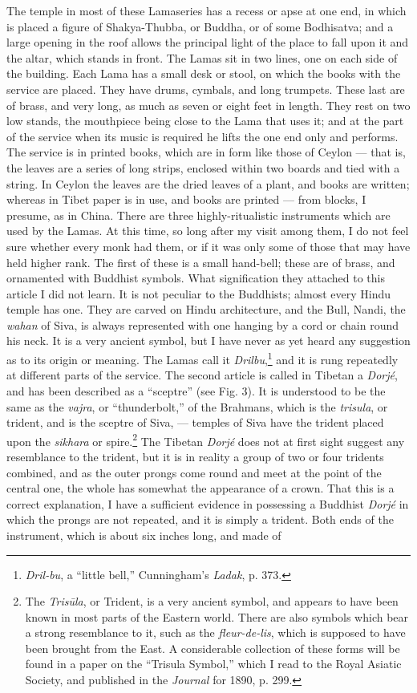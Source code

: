 \documentclass[a4paper, 11pt, oneside, polutonikogreek, english]{article}
\begin{document}
The temple in most of these Lamaseries has a recess or apse at one end, in which is placed a figure of Shakya-Thubba, or Buddha, or of some Bodhisatva; and a large opening in the roof allows the principal light of the place to fall upon it and the altar, which stands in front. The Lamas sit in two lines, one on each side of the building. Each Lama has a small desk or stool, on which the books with the service are placed. They have drums, cymbals, and long trumpets. These last are of brass, and very long, as much as seven or eight feet in length. They rest on two low stands, the mouthpiece being close to the Lama that uses it; and at the part of the service when its music is required he lifts the one end only and performs. The service is in printed books, which are in form like those of Ceylon --- that is, the leaves are a series of long strips, enclosed within two boards and tied with a string. In Ceylon the leaves are the dried leaves of a plant, and books are written; whereas in Tibet paper is in use, and books are printed --- from blocks, I presume, as in China. There are three highly-ritualistic instruments which are used by the Lamas. At this time, so long after my visit among them, I do not feel sure whether every monk had them, or if it was only some of those that may have held higher rank. The first of these is a small hand-bell; these are of brass, and ornamented with Buddhist symbols. What signification they attached to this article I did not learn. It is not peculiar to the Buddhists; almost every Hindu temple has one. They are carved on Hindu architecture, and the Bull, Nandi, the \emph{wahan} of Siva, is always represented with one hanging by a cord or chain round his neck. It is a very ancient symbol, but I have never as yet heard any suggestion as to its origin or meaning. The Lamas call it \emph{Drilbu},\footnote{\emph{Dril-bu}, a ``little bell,'' Cunningham's \emph{Ladak}, p. 373.} and it is rung repeatedly at different parts of the service. The second article is called in Tibetan a \emph{Dorjé}, and has been described as a ``sceptre'' (see Fig. 3). It is understood to be the same as the \emph{vajra}, or ``thunderbolt,'' of the Brahmans, which is the \emph{trisula}, or trident, and is the sceptre of Siva, --- temples of Siva have the trident placed upon the \emph{sikhara} or spire.\footnote{The \emph{Trisūla}, or Trident, is a very ancient symbol, and appears to have been known in most parts of the Eastern world. There are also symbols which bear a strong resemblance to it, such as the \emph{fleur-de-lis}, which is supposed to have been brought from the East. A considerable collection of these forms will be found in a paper on the ``Trisula Symbol,'' which I read to the Royal Asiatic Society, and published in the \emph{Journal} for 1890, p. 299.} The Tibetan \emph{Dorjé} does not at first sight suggest any resemblance to the trident, but it is in reality a group of two or four tridents combined, and as the outer prongs come round and meet at the point of the central one, the whole has somewhat the appearance of a crown. That this is a correct explanation, I have a sufficient evidence in possessing a Buddhist \emph{Dorjé} in which the prongs are not repeated, and it is simply a trident. Both ends of the instrument, which is about six inches long, and made of 
\end{document}
